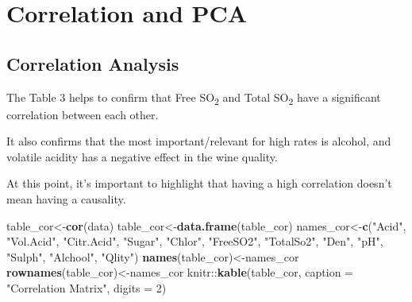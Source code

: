 \documentclass[]{article}
\newenvironment{Shaded}{\begin{snugshade}}{\end{snugshade}}
\newcommand{\KeywordTok}[1]{\textcolor[rgb]{0.13,0.29,0.53}{\textbf{{#1}}}}
\newcommand{\DataTypeTok}[1]{\textcolor[rgb]{0.13,0.29,0.53}{{#1}}}
\newcommand{\DecValTok}[1]{\textcolor[rgb]{0.00,0.00,0.81}{{#1}}}
\newcommand{\StringTok}[1]{\textcolor[rgb]{0.31,0.60,0.02}{{#1}}}
\newcommand{\NormalTok}[1]{{#1}}
\begin{document}
\newpage

\section{Correlation and PCA}\label{correlation-and-pca}

\subsection{Correlation Analysis}\label{correlation-analysis}

The Table 3 helps to confirm that Free SO\textsubscript{2} and Total
SO\textsubscript{2} have a significant correlation between each other.

It also confirms that the most important/relevant for high rates is
alcohol, and volatile acidity has a negative effect in the wine quality.

At this point, it's important to highlight that having a high
correlation doesn't mean having a causality.

\begin{Shaded}
\begin{Highlighting}[]
\NormalTok{table_cor<-}\KeywordTok{cor}\NormalTok{(data)}
\NormalTok{table_cor<-}\KeywordTok{data.frame}\NormalTok{(table_cor)}
\NormalTok{names_cor<-}\KeywordTok{c}\NormalTok{(}\StringTok{"Acid"}\NormalTok{, }\StringTok{"Vol.Acid"}\NormalTok{, }\StringTok{"Citr.Acid"}\NormalTok{, }\StringTok{"Sugar"}\NormalTok{, }\StringTok{"Chlor"}\NormalTok{, }\StringTok{"FreeSO2"}\NormalTok{, }\StringTok{"TotalSo2"}\NormalTok{, }\StringTok{"Den"}\NormalTok{, }\StringTok{"pH"}\NormalTok{, }\StringTok{"Sulph"}\NormalTok{, }\StringTok{"Alchool"}\NormalTok{, }\StringTok{"Qlity"}\NormalTok{)}
\KeywordTok{names}\NormalTok{(table_cor)<-names_cor}
\KeywordTok{rownames}\NormalTok{(table_cor)<-names_cor}
\NormalTok{knitr::}\KeywordTok{kable}\NormalTok{(table_cor, }\DataTypeTok{caption =} \StringTok{"Correlation Matrix"}\NormalTok{, }\DataTypeTok{digits =} \DecValTok{2}\NormalTok{)}
\end{Highlighting}
\end{Shaded}
\end{document}
